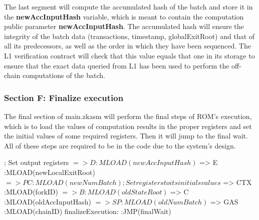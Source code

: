 The last segment will compute the accumulated hash of the batch and store it in the \textbf{newAccInputHash} variable, which is meant to contain the computation public parameter \textbf{newAccInputHash}. The accumulated hash will ensure the integrity of the batch data (transactions, timestamp, globalExitRoot) and that of all its predecessors, as well as the order in which they have been sequenced. The L1 verification contract will check that this value equals that one in its storage to ensure that the exact data queried from L1 has been used to perform the off-chain computations of the batch.




\subsubsection{Section F: Finalize execution}

The final section of main.zkasm will perform the final steps of ROM's execution, which is to load the values of computation results in the proper registers and set the initial values of some required registers. Then it will jump to the final wait. All of these steps are required to be in the code due to the system's design.

\begin{zkasm}
    ; Set output registers
    $ => D                          :MLOAD(newAccInputHash)
    $ => E                          :MLOAD(newLocalExitRoot)
    $ => PC                         :MLOAD(newNumBatch)
    
    ; Set registers to its initials values
    $ => CTX                        :MLOAD(forkID)
    $ => B                          :MLOAD(oldStateRoot)
    $ => C                          :MLOAD(oldAccInputHash)
    $ => SP                         :MLOAD(oldNumBatch)
    $ => GAS                        :MLOAD(chainID)
    finalizeExecution:
    :JMP(finalWait)
\end{zkasm}





